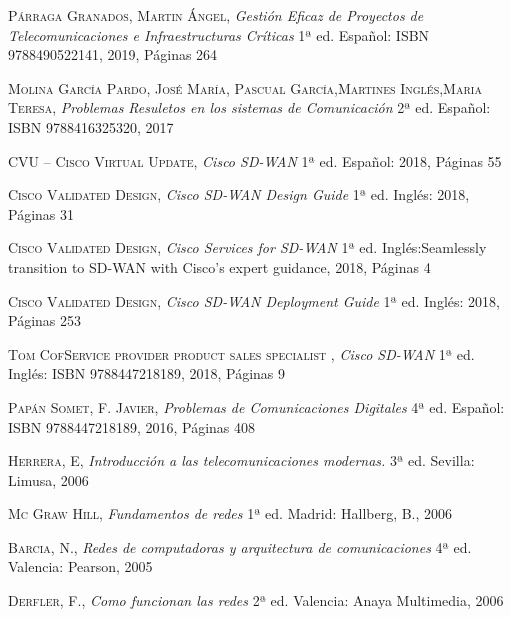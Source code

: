 \begin{thebibliography}{a}

 \textsc{Párraga Granados, Martin Ángel},
\textit{Gestión Eficaz de Proyectos de Telecomunicaciones e Infraestructuras Críticas}
1ª ed. Español: ISBN 9788490522141, 2019, Páginas 264

 \textsc{Molina García Pardo, José María, Pascual García,Martines Inglés,Maria Teresa},
\textit{Problemas Resuletos en los sistemas de Comunicación}
2ª ed. Español: ISBN 9788416325320, 2017 

 \textsc{CVU – Cisco Virtual Update},
\textit{Cisco SD-WAN}
1ª ed. Español: 2018, Páginas 55

 \textsc{Cisco Validated Design},
\textit{Cisco SD-WAN Design Guide}
1ª ed. Inglés:  2018, Páginas 31

 \textsc{Cisco Validated Design},
\textit{Cisco Services for SD-WAN}
1ª ed. Inglés:Seamlessly transition to SD-WAN with Cisco's expert guidance,  2018, Páginas 4

 \textsc{Cisco Validated Design},
\textit{Cisco SD-WAN Deployment Guide}
1ª ed. Inglés: 2018, Páginas 253

 \textsc{Tom CofService provider product sales specialist },
\textit{Cisco SD-WAN}
1ª ed. Inglés: ISBN 9788447218189, 2018, Páginas 9


 \textsc{Papán Somet, F. Javier},
\textit{Problemas de Comunicaciones Digitales}
4ª ed. Español: ISBN 9788447218189, 2016, Páginas 408

 \textsc{Herrera, E},
\textit{Introducción a las telecomunicaciones modernas.}
3ª ed. Sevilla: Limusa, 2006  

 \textsc{Mc Graw Hill},
\textit{Fundamentos de redes}
1ª ed. Madrid: Hallberg, B., 2006

 \textsc{Barcia, N.},
\textit{Redes de computadoras y arquitectura de comunicaciones}
4ª ed. Valencia: Pearson, 2005 

 \textsc{Derfler, F.},
\textit{Como funcionan las redes}
2ª ed. Valencia: Anaya Multimedia, 2006 



\end{thebibliography}




 


